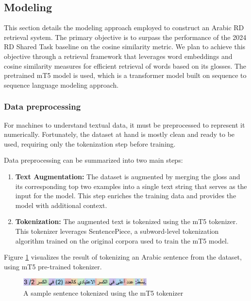 \documentclass[15pt]{article}
\begin{document}
\subsection{Modeling}

This section details the modeling approach employed to construct an Arabic RD retrieval system. The primary objective is to surpass the performance of the 2024 RD Shared Task baseline on the cosine similarity metric. We plan to achieve this objective through a retrieval framework that leverages word embeddings and cosine similarity measures for efficient retrieval of words based on its glosses. The pretrained mT5 model is used, which is a transformer model built on sequence to sequence language modeling approach.

\subsubsection{Data preprocessing}

For machines to understand textual data, it must be preprocessed to represent it numerically. Fortunately, the dataset at hand is mostly clean and ready to be used, requiring only the tokenization step before training.

Data preprocessing can be summarized into two main steps:

\begin{enumerate}
    \item \textbf{Text Augmentation:} The dataset is augmented by merging the gloss and its corresponding top two examples into a single text string that serves as the input for the model. This step enriches the training data and provides the model with additional context.
    \item \textbf{Tokenization:} The augmented text is tokenized using the mT5 tokenizer. This tokenizer leverages SentencePiece, a subword-level tokenization algorithm trained on the original corpora used to train the mT5 model.
\end{enumerate}

Figure \ref{fig:tokenized-sentence} visualizes the result of tokenizing an Arabic sentence from the dataset, using mT5 pre-trained tokenizer.

\begin{figure}[H]
    \centering
    \captionsetup{justification=centering}
    \includegraphics[width=0.6\textwidth]{tokenized-sentence.png}
    \caption{A sample sentence tokenized using the mT5 tokenizer}
    \label{fig:tokenized-sentence}
\end{figure}
\end{document}
